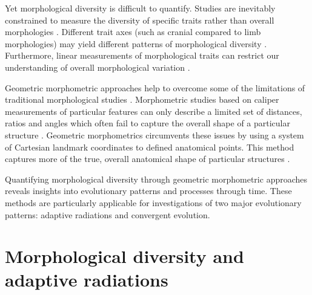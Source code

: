 	Yet morphological diversity is difficult to quantify. Studies are inevitably constrained to measure the diversity of specific traits rather than overall morphologies \citep{Roy1997}. Different trait axes (such as cranial compared to limb morphologies) may yield different patterns of morphological diversity \citep{Foth2012}. Furthermore, linear measurements of morphological traits can restrict our understanding of overall morphological variation \citep{Rohlf1993}.
	
	Geometric morphometric approaches help to overcome some of the limitations of traditional morphological studies \citep{Adams2004}. Morphometric studies based on caliper measurements of particular features can only describe a limited set of distances, ratios and angles which often fail to capture the overall shape of a particular structure \citep{Slice2007}. Geometric morphometrics circumvents these issues by using a system of Cartesian landmark coordinates to defined anatomical points. This method captures more of the true, overall anatomical shape of particular structures \citep{Mitteroecker2009}.
	
	Quantifying morphological diversity through geometric morphometric approaches reveals insights into evolutionary patterns and processes through time. These methods are particularly applicable for investigations of two major evolutionary patterns: adaptive radiations and convergent evolution.
\section{Morphological diversity and adaptive radiations} 


